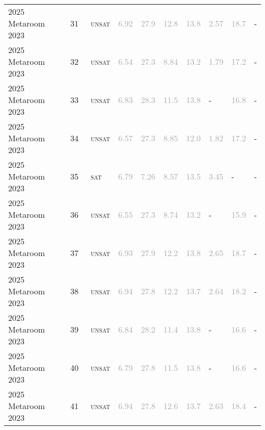 \begin{center}
{\begin{longtable}{@{}llllllllll@{}}
2025 Metaroom 2023 & 31 & ~\textsc{unsat} & \textcolor{darkgray}{6.92} & \textcolor{darkgray}{27.9} & \textcolor{darkgray}{12.8} & \textcolor{darkgray}{13.8} & \textcolor{darkgray}{2.57} & \textcolor{darkgray}{18.7} & - \\
2025 Metaroom 2023 & 32 & ~\textsc{unsat} & \textcolor{darkgray}{6.54} & \textcolor{darkgray}{27.3} & \textcolor{darkgray}{8.84} & \textcolor{darkgray}{13.2} & \textcolor{darkgray}{1.79} & \textcolor{darkgray}{17.2} & - \\
2025 Metaroom 2023 & 33 & ~\textsc{unsat} & \textcolor{darkgray}{6.83} & \textcolor{darkgray}{28.3} & \textcolor{darkgray}{11.5} & \textcolor{darkgray}{13.8} & - & \textcolor{darkgray}{16.8} & - \\
2025 Metaroom 2023 & 34 & ~\textsc{unsat} & \textcolor{darkgray}{6.57} & \textcolor{darkgray}{27.3} & \textcolor{darkgray}{8.85} & \textcolor{darkgray}{12.0} & \textcolor{darkgray}{1.82} & \textcolor{darkgray}{17.2} & - \\
2025 Metaroom 2023 & 35 & ~\textsc{sat} & \textcolor{darkgray}{6.79} & \textcolor{darkgray}{7.26} & \textcolor{darkgray}{8.57} & \textcolor{darkgray}{13.5} & \textcolor{darkgray}{3.45} & - & - \\
2025 Metaroom 2023 & 36 & ~\textsc{unsat} & \textcolor{darkgray}{6.55} & \textcolor{darkgray}{27.3} & \textcolor{darkgray}{8.74} & \textcolor{darkgray}{13.2} & - & \textcolor{darkgray}{15.9} & - \\
2025 Metaroom 2023 & 37 & ~\textsc{unsat} & \textcolor{darkgray}{6.93} & \textcolor{darkgray}{27.9} & \textcolor{darkgray}{12.2} & \textcolor{darkgray}{13.8} & \textcolor{darkgray}{2.65} & \textcolor{darkgray}{18.7} & - \\
2025 Metaroom 2023 & 38 & ~\textsc{unsat} & \textcolor{darkgray}{6.94} & \textcolor{darkgray}{27.8} & \textcolor{darkgray}{12.2} & \textcolor{darkgray}{13.7} & \textcolor{darkgray}{2.64} & \textcolor{darkgray}{18.2} & - \\
2025 Metaroom 2023 & 39 & ~\textsc{unsat} & \textcolor{darkgray}{6.84} & \textcolor{darkgray}{28.2} & \textcolor{darkgray}{11.4} & \textcolor{darkgray}{13.8} & - & \textcolor{darkgray}{16.6} & - \\
2025 Metaroom 2023 & 40 & ~\textsc{unsat} & \textcolor{darkgray}{6.79} & \textcolor{darkgray}{27.8} & \textcolor{darkgray}{11.5} & \textcolor{darkgray}{13.8} & - & \textcolor{darkgray}{16.6} & - \\
2025 Metaroom 2023 & 41 & ~\textsc{unsat} & \textcolor{darkgray}{6.94} & \textcolor{darkgray}{27.8} & \textcolor{darkgray}{12.6} & \textcolor{darkgray}{13.7} & \textcolor{darkgray}{2.63} & \textcolor{darkgray}{18.4} & - \\

\end{longtable}}
\end{center}

